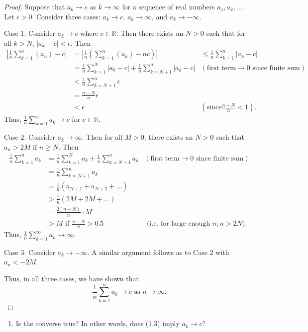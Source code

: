 \documentclass[12pt,]{article}
\providecommand{\tightlist}{%
  \setlength{\itemsep}{0pt}\setlength{\parskip}{0pt}}
\begin{document}
\begin{proof}
Suppose that $a_k \rightarrow c$ as $k \rightarrow \infty$ for a sequence of real numbers $a_1, a_2,...$. Let $\epsilon > 0$. Consider three cases: $a_k \rightarrow c$, $a_k \rightarrow \infty$, and $a_k \rightarrow -\infty$. 

Case 1: Consider $a_k \rightarrow c$ where $c \in \mathbb{R}$. Then there exists an $N>0$ such that for all $k>N$, $|a_k-c|<\epsilon.$ Then 
\begin{align*}
\left|\frac{1}{n}\sum_{k = 1}^n (a_n) -c\right| & = \left|\frac{1}{n}\left(\sum_{k = 1}^n(a_k) - nc\right)\right|& \le \frac{1}{n}\sum_{k = 1}^n|a_k - c|\\
& = \frac{1}{n}\sum_{k=1}^{N}|a_k-c|+\frac{1}{n}\sum_{k=N+1}^{n}|a_k-c| &(\text{first term} \rightarrow 0 \text{ since finite sum})\\
& < \frac{1}{n}\sum_{k=N+1}^n\epsilon\\
& = \frac{n-N}{n}\epsilon\\
& < \epsilon & (\text{since} \frac{n-N}{n}<1).
\end{align*}
Thus, $\frac{1}{n}\sum_{k=1}^na_k\rightarrow c$ for $c\in \mathbb{R}.$

Case 2: Consider $a_k \rightarrow \infty$. Then for all $M>0$, there exists an $N>0$ such that $a_n>2M$ if $n\ge N$. Then
\begin{align*}
\frac{1}{n}\sum_{k=1}^n a_k &= \frac{1}{n}\sum_{k=1}^Na_k + \frac{1}{n}\sum_{k=N+1}^n a_k &(\text{first term} \rightarrow 0 \text{ since finite sum})\\
& = \frac{1}{n}\sum_{k=N+1}^n a_k\\
& = \frac{1}{n}\left(a_{N+1} + a_{N+2} + ...\right)\\
& > \frac{1}{n}\left(2M + 2M + ...\right)\\
& =\frac{2(n-N)}{n}\cdot M\\
& > M \text{ if } \frac{n-N}{n}>0.5 & \text{ (i.e. for large enough } n; n>2N). 
\end{align*}
Thus, $\frac{1}{n}\sum_{k=1}^\infty a_n \rightarrow \infty.$

Case 3: Consider $a_k \rightarrow -\infty$. A similar argument follows as to Case 2 with $a_n < -2M$.

Thus, in all three cases, we have shown that $$\frac{1}{n}\sum_{k=1}^n a_k \rightarrow c \text{ as } n \rightarrow \infty. $$
\end{proof}

\begin{enumerate}
\def\labelenumi{\alph{enumi}.}
\setcounter{enumi}{1}
\tightlist
\item
  Is the converse true? In other words, does (1.3) imply
  \(a_k \rightarrow c\)?
\end{enumerate}
\end{document}
